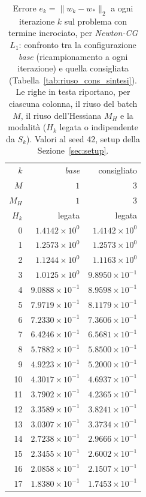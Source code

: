 \begin{table}[H]
\centering
\footnotesize
\renewcommand{\arraystretch}{0.85}
\setlength{\tabcolsep}{8pt}
\caption{Errore $e_k=\|w_k-w_*\|_2$ a ogni iterazione $k$ sul problema con termine incrociato, per \emph{Newton-CG $L_1$}: confronto tra la configurazione \emph{base} (ricampionamento a ogni iterazione) e quella consigliata (Tabella~\ref{tab:riuso_cons_sintesi}). Le righe in testa riportano, per ciascuna colonna, il riuso del batch $M$, il riuso dell'Hessiana $M_H$ e la modalità ($H_k$ legata o indipendente da $S_k$). Valori al seed 42, setup della Sezione~\ref{sec:setup}.}
\label{tab:riuso_cons_offdiag_nl1}
\begin{tabular}{@{}rrr@{}}
\toprule
$k$ & \emph{base} & consigliato\\
$M$ & $1$ & $3$\\
$M_H$ & $1$ & $3$\\
$H_k$ & legata & legata\\
\midrule
0 & $1.4142\times10^{0}$ & $1.4142\times10^{0}$\\
1 & $1.2573\times10^{0}$ & $1.2573\times10^{0}$\\
2 & $1.1244\times10^{0}$ & $1.1163\times10^{0}$\\
3 & $1.0125\times10^{0}$ & $9.8950\times10^{-1}$\\
4 & $9.0888\times10^{-1}$ & $8.9598\times10^{-1}$\\
5 & $7.9719\times10^{-1}$ & $8.1179\times10^{-1}$\\
6 & $7.2330\times10^{-1}$ & $7.3606\times10^{-1}$\\
7 & $6.4246\times10^{-1}$ & $6.5681\times10^{-1}$\\
8 & $5.7882\times10^{-1}$ & $5.8500\times10^{-1}$\\
9 & $4.9223\times10^{-1}$ & $5.2000\times10^{-1}$\\
10 & $4.3017\times10^{-1}$ & $4.6937\times10^{-1}$\\
11 & $3.7902\times10^{-1}$ & $4.2365\times10^{-1}$\\
12 & $3.3589\times10^{-1}$ & $3.8241\times10^{-1}$\\
13 & $3.0307\times10^{-1}$ & $3.3734\times10^{-1}$\\
14 & $2.7238\times10^{-1}$ & $2.9666\times10^{-1}$\\
15 & $2.3455\times10^{-1}$ & $2.6002\times10^{-1}$\\
16 & $2.0858\times10^{-1}$ & $2.1507\times10^{-1}$\\
17 & $1.8380\times10^{-1}$ & $1.7453\times10^{-1}$\\

\end{tabular}
\end{table}
